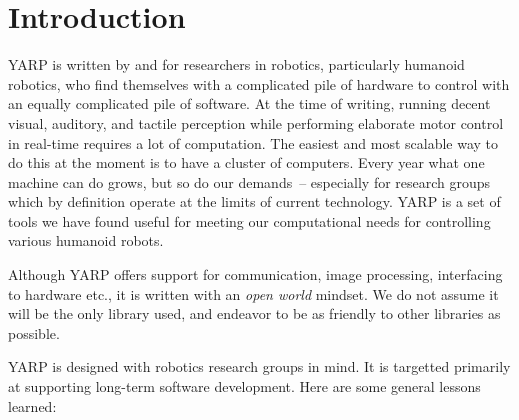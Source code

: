 \section{Introduction}

YARP is written by and for researchers in robotics, particularly
humanoid robotics, who find themselves with a complicated pile of
hardware to control with an equally complicated pile of software. 
%
At the time of writing, running decent visual, auditory, and tactile
perception while performing elaborate motor control in real-time
requires a lot of computation. The easiest and most scalable way to do
this at the moment is to have a cluster of computers. Every year what
one machine can do grows, but so do our demands~-- especially for
research groups which by definition operate at the limits of current
technology. YARP is a set of tools we have found useful for meeting
our computational needs for controlling various humanoid robots.

Although YARP offers support for communication, image processing,
interfacing to hardware etc., it is written with an {\em open world}
mindset.  We do not assume it will be the only library used, and
endeavor to be as friendly to other libraries as possible.


YARP is designed with robotics research groups in mind. 
%
It is targetted primarily at supporting long-term software development.
%
Here are some general lessons learned:

